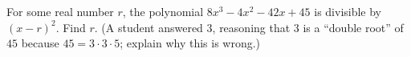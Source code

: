 For some real number $r$, the polynomial $8x^3-4x^2-42x+45$ is divisible by $(x-r)^2$. Find $r$. (A student answered $3$, reasoning that $3$ is a ``double root'' of $45$ because $45=3\cdot3\cdot5$; explain why this is wrong.)
